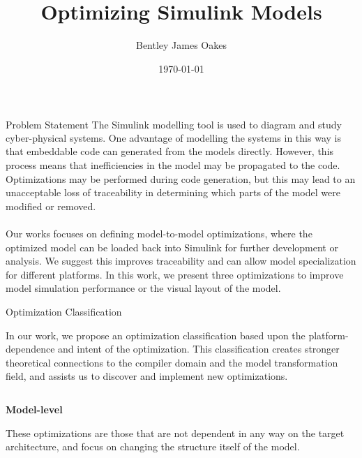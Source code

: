\documentclass[final,hyperref={pdfpagelabels=false}]{beamer}
\title{Optimizing Simulink\textsuperscript{\textregistered} Models}
\author{Bentley James Oakes}
\institute[McGill University]{McGill University, Montreal, Canada}
\date{\today}
\begin{document}
  \begin{frame}{}
      
        \begin{block}{\large Problem Statement}
        \small
   		The Simulink\textsuperscript{\textregistered} modelling tool is used to diagram and study cyber-physical systems. One advantage
   		of modelling the systems in this way is that embeddable code can generated from the models directly.
   		However, this process means that inefficiencies in the model may be propagated to the code. Optimizations may be performed during code
   		generation, but this may lead to an unacceptable loss of traceability in determining
   		which parts of the model were modified or removed.\\~\\
   	    Our works focuses on defining model-to-model optimizations, where the optimized
   		model can be loaded back into Simulink for further development or analysis. We suggest this improves traceability and
   		can allow model specialization for different platforms. In this work, we present three optimizations to improve model simulation performance or the visual layout of the model.
        \end{block}
        

    \begin{block}{Optimization Classification}
    \begin{center}
    \small
    In our work, we propose an optimization classification based upon the platform-dependence and intent of the optimization. This classification creates
    stronger theoretical connections to the compiler domain and the model
    transformation field, and assists us to discover and implement new optimizations.
    \end{center}
    \vspace{-1.5cm}
            \begin{columns}[t,totalwidth=\linewidth]
             \begin{column}{.19\linewidth}
             \small
           \begin{center}\textbf{Model-level}\end{center}
           \footnotesize
           These optimizations are those that are not dependent in any way on the target architecture, and focus on changing the structure itself of the model. \\~\\~\\
           

\end{column}
\end{columns}
\end{block}
\end{frame}
\end{document}
